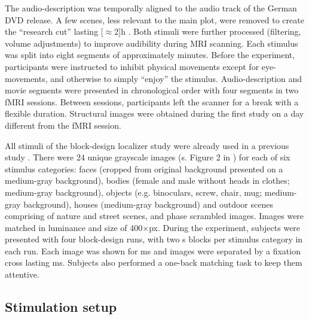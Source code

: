 \documentclass[english]{article}
\begin{document}
The audio-description was temporally aligned to the audio track of the German
DVD release. A few scenes, less relevant to the main plot, were removed to create
the ``research cut'' lasting \unit[$\approx$2]{h} \citep{hanke2014audiomovie,
hanke2016simultaneous}.
Both stimuli were further processed (filtering, volume adjustments) to improve
audibility during MRI scanning.
Each stimulus was split into eight segments of approximately \unit[15]{minutes}.
Before the experiment, participants were instructed to inhibit physical
movements except for eye-movements, and otherwise to simply ``enjoy'' the
stimulus.
Audio-description and movie segments were presented in chronological order with
four segments in two fMRI sessions. Between sessions, participants left the
scanner for a break with a flexible duration. Structural images were obtained
during the first study on a day different from the fMRI session.

All stimuli of the block-design localizer study were already used in a previous study
\citep{haxby2011common}.
%
There were 24 unique grayscale images (s. Figure 2 in
\citep{sengupta2016extension}) for each of six stimulus categories:
faces (cropped from original background presented on a medium-gray background),
bodies (female and male without heads in clothes; medium-gray background),
objects (e.g. binoculars, screw, chair, mug; medium-gray background), houses
(medium-gray background) and outdoor scenes comprising of nature and street
scenes, and phase scrambled images.
Images were matched in luminance and size of 400$\times$\unit[400]{px}.
During the experiment, subjects were presented with four block-design runs, with
two \unit[16]{s} blocks per stimulus category in each run.
Each image was shown for \unit[900]{ms} and images were separated by a fixation
cross lasting \unit[100]{ms}.
Subjects also performed a one-back matching task to keep them attentive.


\subsection{Stimulation setup}
\end{document}
